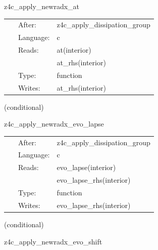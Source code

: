 \documentclass{article}
\begin{document}
\hspace{5mm} z4c\_apply\_newradx\_at 



\hspace{5mm}

 \begin{tabular*}{160mm}{cll} 
~ & After:  & z4c\_apply\_dissipation\_group \\ 
~ & Language:  & c \\ 
~ & Reads:  & at(interior) \\ 
~& ~ &at\_rhs(interior)\\ 
~ & Type:  & function \\ 
~ & Writes:  & at\_rhs(interior) \\ 
\end{tabular*} 


\vspace{5mm}

   (conditional) 

\hspace{5mm} z4c\_apply\_newradx\_evo\_lapse 



\hspace{5mm}

 \begin{tabular*}{160mm}{cll} 
~ & After:  & z4c\_apply\_dissipation\_group \\ 
~ & Language:  & c \\ 
~ & Reads:  & evo\_lapse(interior) \\ 
~& ~ &evo\_lapse\_rhs(interior)\\ 
~ & Type:  & function \\ 
~ & Writes:  & evo\_lapse\_rhs(interior) \\ 
\end{tabular*} 


\vspace{5mm}

   (conditional) 

\hspace{5mm} z4c\_apply\_newradx\_evo\_shift 
\end{document}
